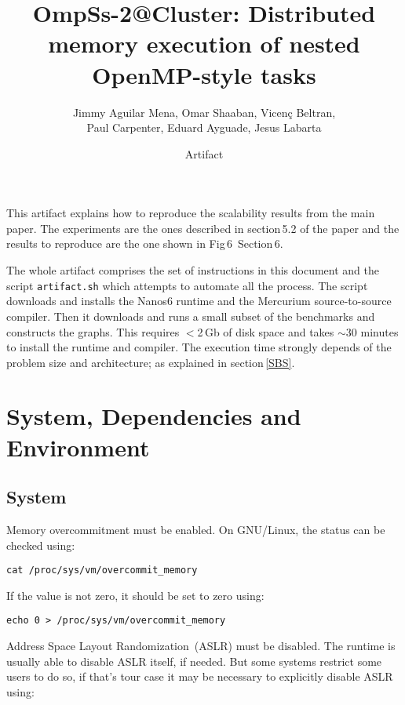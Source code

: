 \documentclass{article}
\newcommand{\code}[1]{\texttt{#1}}
\begin{document}
\title{OmpSs-2@Cluster: Distributed memory execution of nested OpenMP-style tasks}

\author{Jimmy Aguilar Mena, Omar Shaaban, Vicen\c{c} Beltran,\\
  Paul Carpenter, Eduard Ayguade, Jesus Labarta}
\date{Artifact}

\maketitle

This artifact explains how to reproduce the scalability results from
the main paper.  The experiments are the ones described in
section\,5.2 of the paper and the results to reproduce are the one
shown in Fig\,6~Section\,6.

The whole artifact comprises the set of instructions in this document
and the script \code{artifact.sh} which attempts to automate all the
process.  The script downloads and installs the Nanos6 runtime and the
Mercurium source-to-source compiler.  Then it downloads and runs a
small subset of the benchmarks and constructs the graphs.  This
requires $<$2\,Gb of disk space and takes $\sim$30 minutes to install
the runtime and compiler.  The execution time strongly depends of the
problem size and architecture; as explained in section\,\ref{SBS}.

\section{System, Dependencies and Environment}

\subsection{System}

Memory overcommitment must be enabled. On GNU/Linux, the status can be
checked using:

\begin{lstlisting}
cat /proc/sys/vm/overcommit_memory
\end{lstlisting}

If the value is not zero, it should be set to zero using:

\begin{lstlisting}
echo 0 > /proc/sys/vm/overcommit_memory
\end{lstlisting}

Address Space Layout Randomization~(ASLR) must be disabled.  The
runtime is usually able to disable ASLR itself, if needed. But some
systems restrict some users to do so, if that's tour case it may be
necessary to explicitly disable ASLR using:
\end{document}
